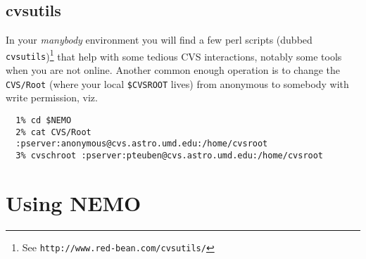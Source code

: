 \section{cvsutils}

In your {\it manybody} environment you will find a few perl scripts
(dubbed {\tt cvsutils})\footnote{See {\tt http://www.red-bean.com/cvsutils/}}
that help with some tedious CVS interactions, notably some tools when
you are not online. Another common enough operation is to change the 
{\tt CVS/Root}
(where your local {\tt \$CVSROOT} lives) from anonymous to somebody with
write permission, viz.

\footnotesize\begin{verbatim}
  1% cd $NEMO
  2% cat CVS/Root
  :pserver:anonymous@cvs.astro.umd.edu:/home/cvsroot
  3% cvschroot :pserver:pteuben@cvs.astro.umd.edu:/home/cvsroot
\end{verbatim}\normalsize




\chapter                {Using NEMO}

